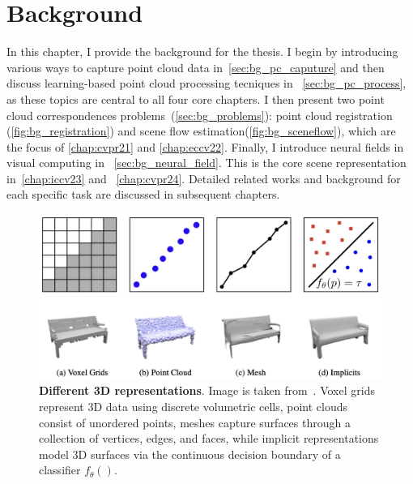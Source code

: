 \chapter{Background}
\label{chap:background}

In this chapter, I provide the background for the thesis. I begin by introducing various ways to capture point cloud data in~\cref{sec:bg_pc_caputure} and then discuss learning-based point cloud processing tecniques in ~\cref{sec:bg_pc_process}, as these topics are central to all four core chapters. I then present two point cloud correspondences problems~(\cref{sec:bg_problems}): point cloud registration (\cref{fig:bg_registration}) and scene flow estimation(\cref{fig:bg_sceneflow}), which are the focus of \cref{chap:cvpr21} and \cref{chap:eccv22}. Finally, I introduce neural fields in visual computing in ~\cref{sec:bg_neural_field}. This is the core scene representation in~\cref{chap:iccv23} and ~\cref{chap:cvpr24}. Detailed related works and background for each specific task are discussed in subsequent chapters.




\begin{figure}[t]
    \centering
    \includegraphics[width=1.0\columnwidth]{imgs/3d_representation.png}
    \caption{\textbf{Different 3D representations}. Image is taken from~\cite{mescheder2019occupancy}. Voxel grids represent 3D data using discrete volumetric cells, point clouds consist of unordered points, meshes capture surfaces through a collection of vertices, edges, and faces, while implicit representations model 3D surfaces via the continuous decision boundary of a classifier $f_{\theta}()$.}
    \label{fig:3d_representation}
\end{figure}


